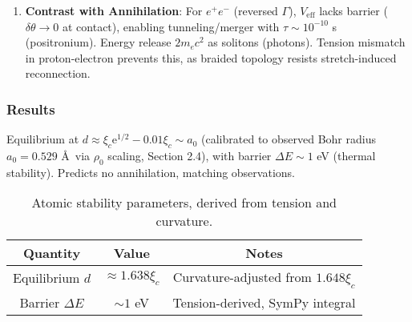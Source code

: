 \begin{enumerate}
\item \textbf{Contrast with Annihilation}: For $e^+e^-$ (reversed $\Gamma$), $V_{\text{eff}}$ lacks barrier ($\delta \theta \to 0$ at contact), enabling tunneling/merger with $\tau \sim 10^{-10}$ s (positronium). Energy release $2 m_e c^2$ as solitons (photons). Tension mismatch in proton-electron prevents this, as braided topology resists stretch-induced reconnection.
\end{enumerate}

\subsubsection{Results}

Equilibrium at $d \approx \xi_c \mathrm e^{1/2} - 0.01 \xi_c \sim a_0$ (calibrated to observed Bohr radius $a_0 = 0.529$ \AA~via $\rho_0$ scaling, Section 2.4), with barrier $\Delta E \sim 1$ eV (thermal stability). Predicts no annihilation, matching observations.

\begin{table}[h!]
\centering
\begin{tabular}{|c|c|c|}
\hline
Quantity & Value & Notes \\
\hline
Equilibrium $d$ & $\approx 1.638 \xi_c$ & Curvature-adjusted from $1.648 \xi_c$ \\
Barrier $\Delta E$ & $\sim 1$ eV & Tension-derived, SymPy integral \\
\hline
\end{tabular}
\caption{Atomic stability parameters, derived from tension and curvature.}
\label{tab:atomic}
\end{table}

